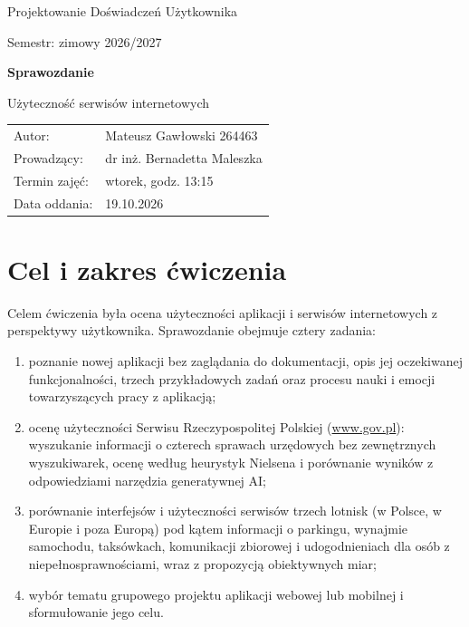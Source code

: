 \documentclass[11pt,a4paper]{article}
\newcommand{\przedmiot}{Projektowanie Doświadczeń Użytkownika}
\newcommand{\semestr}{zimowy 2026/2027}
\newcommand{\terminzajec}{wtorek, godz. 13:15}
\newcommand{\prowadzacy}{dr inż. Bernadetta Maleszka}
\newcommand{\tytulzadania}{Użyteczność serwisów internetowych}
\newcommand{\dataoddania}{19.10.2026}
\newcommand{\autor}{Mateusz Gawłowski 264463}
\begin{document}
\begin{titlepage}
  \centering
  \vspace*{2cm}
  {\Large \przedmiot\par}
  \vspace{0.4cm}
  {\large Semestr: \semestr\par}
  \vspace{2.5cm}
  {\Huge\bfseries Sprawozdanie\par}
  \vspace{0.6cm}
  {\LARGE \tytulzadania\par}
  \vfill
  \begin{tabular}{@{}ll@{}}
    Autor: & \autor \\
    Prowadzący: & \prowadzacy \\
    Termin zajęć: & \terminzajec \\
    Data oddania: & \dataoddania \\
  \end{tabular}
  \vspace{2cm}
\end{titlepage}

\tableofcontents
\newpage

\section*{Cel i zakres ćwiczenia}

Celem ćwiczenia była ocena użyteczności aplikacji i serwisów internetowych z perspektywy użytkownika. Sprawozdanie obejmuje cztery zadania:

\begin{enumerate}[leftmargin=*]
  \item poznanie nowej aplikacji bez zaglądania do dokumentacji, opis jej oczekiwanej funkcjonalności, trzech przykładowych zadań oraz procesu nauki i emocji towarzyszących pracy z aplikacją;
  \item ocenę użyteczności Serwisu Rzeczypospolitej Polskiej (\url{www.gov.pl}): wyszukanie informacji o czterech sprawach urzędowych bez zewnętrznych wyszukiwarek, ocenę według heurystyk Nielsena i porównanie wyników z odpowiedziami narzędzia generatywnej AI;
  \item porównanie interfejsów i użyteczności serwisów trzech lotnisk (w Polsce, w Europie i poza Europą) pod kątem informacji o parkingu, wynajmie samochodu, taksówkach, komunikacji zbiorowej i udogodnieniach dla osób z niepełnosprawnościami, wraz z propozycją obiektywnych miar;
  \item wybór tematu grupowego projektu aplikacji webowej lub mobilnej i sformułowanie jego celu.
\end{enumerate}
\end{document}
